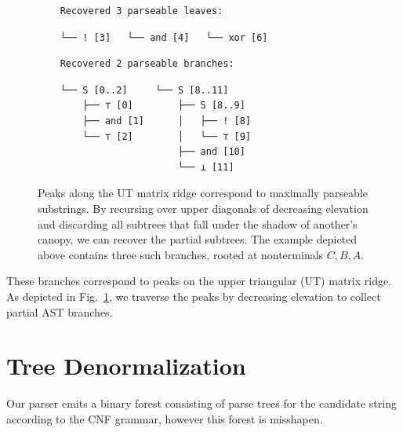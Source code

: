 \documentclass[sigplan,review,anonymous,acmsmall]{acmart}\settopmatter{printfolios=false,printccs=false,printacmref=false}
\begin{document}
\begin{figure}[H]
\begin{minipage}[l]{6cm}
      \begin{verbatim}
    Recovered 3 parseable leaves:
      \end{verbatim}
      \noindent\hspace{0.64cm}\hspace{1.70cm}\hspace{1.98cm}\vspace{-5pt}
      \begin{verbatim}
    └── ! [3]   └── and [4]   └── xor [6]
      \end{verbatim}

      \begin{verbatim}
    Recovered 2 parseable branches:
      \end{verbatim}
    \hspace{0.63cm}\hspace{2.48cm}\vspace{-5pt}
      \begin{verbatim}
    └── S [0..2]     └── S [8..11]
        ├── ⊤ [0]        ├── S [8..9]
        ├── and [1]      │   ├── ! [8]
        └── ⊤ [2]        │   └── ⊤ [9]
                         ├── and [10]
                         └── ⊥ [11]
      \end{verbatim}
    \end{minipage}
  \caption{Peaks along the UT matrix ridge correspond to maximally parseable substrings. By recursing over upper diagonals of decreasing elevation and discarding all subtrees that fall under the shadow of another's canopy, we can recover the partial subtrees. The example depicted above contains three such branches, rooted at nonterminals $C, B, A$.}\label{fig:peaks}
\end{figure}

\noindent These branches correspond to peaks on the upper triangular (UT) matrix ridge. As depicted in Fig.~\ref{fig:peaks}, we traverse the peaks by decreasing elevation to collect partial AST branches.

\section{Tree Denormalization}


Our parser emits a binary forest consisting of parse trees for the candidate string according to the CNF grammar, however this forest is misshapen.
\end{document}
